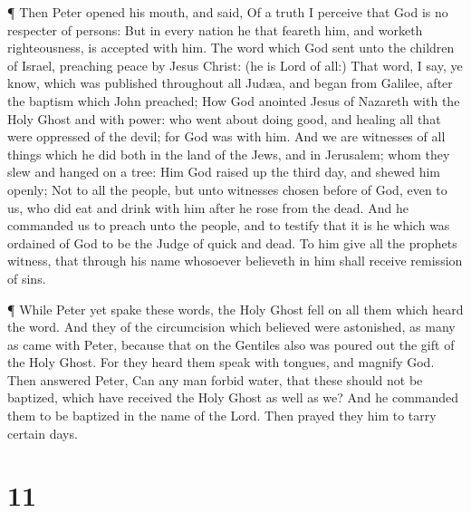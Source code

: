  ¶ Then Peter opened his mouth, and said, Of a truth I
perceive that God is no respecter of persons:  But in every
nation he that feareth him, and worketh righteousness, is accepted with
him.  The word which God sent unto the children of Israel,
preaching peace by Jesus Christ: (he is Lord of all:)  That
word, I say, ye know, which was published throughout all Judæa, and
began from Galilee, after the baptism which John preached; 
How God anointed Jesus of Nazareth with the Holy Ghost and with power:
who went about doing good, and healing all that were oppressed of the
devil; for God was with him.  And we are witnesses of all
things which he did both in the land of the Jews, and in Jerusalem; whom
they slew and hanged on a tree:  Him God raised up the
third day, and shewed him openly;  Not to all the people,
but unto witnesses chosen before of God, even to us, who did eat and
drink with him after he rose from the dead.  And he
commanded us to preach unto the people, and to testify that it is he
which was ordained of God to be the Judge of quick and dead.
 To him give all the prophets witness, that through his
name whosoever believeth in him shall receive remission of sins.

 ¶ While Peter yet spake these words, the Holy Ghost fell
on all them which heard the word.  And they of the
circumcision which believed were astonished, as many as came with Peter,
because that on the Gentiles also was poured out the gift of the Holy
Ghost.  For they heard them speak with tongues, and magnify
God. Then answered Peter,  Can any man forbid water, that
these should not be baptized, which have received the Holy Ghost as well
as we?  And he commanded them to be baptized in the name of
the Lord. Then prayed they him to tarry certain days.

\hypertarget{section-10}{%
\section{11}\label{section-10}}

